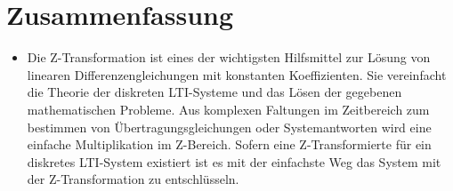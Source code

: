 \documentclass[11pt]{article}
\providecommand{\tightlist}{%
      \setlength{\itemsep}{0pt}\setlength{\parskip}{0pt}}
\begin{document}
    \section{Zusammenfassung}\label{zusammenfassung}

\begin{itemize}
\tightlist
\item
  Die Z-Transformation ist eines der wichtigsten Hilfsmittel zur Lösung
  von linearen Differenzengleichungen mit konstanten Koeffizienten. Sie
  vereinfacht die Theorie der diskreten LTI-Systeme und das Lösen der
  gegebenen mathematischen Probleme. Aus komplexen Faltungen im
  Zeitbereich zum bestimmen von Übertragungsgleichungen oder
  Systemantworten wird eine einfache Multiplikation im Z-Bereich. Sofern
  eine Z-Transformierte für ein diskretes LTI-System existiert ist es
  mit der einfachste Weg das System mit der Z-Transformation zu
  entschlüsseln.
\end{itemize}


    
    
    
    
\end{document}
